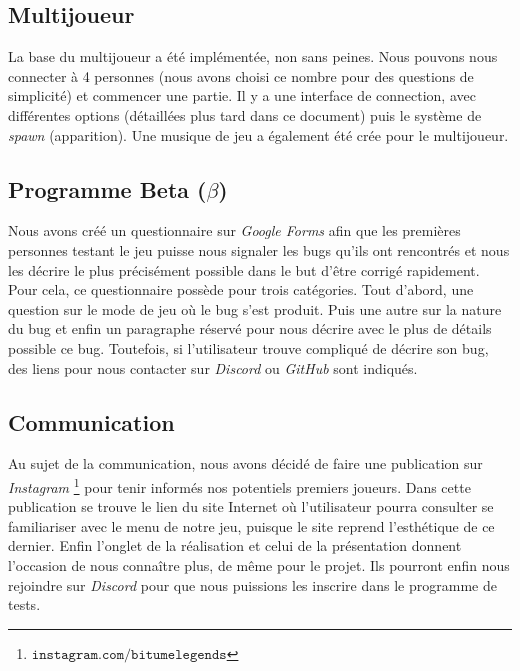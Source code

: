 \documentclass[12pt,a4paper]{article}
\begin{document}
    \subsection{Multijoueur}
        La base du multijoueur a été implémentée, non sans peines. 
        Nous pouvons nous connecter à 4 personnes (nous avons choisi ce nombre pour des questions 
        de simplicité) et commencer une partie. Il y a une interface de connection, avec différentes 
        options (détaillées plus tard dans ce document) puis le système de \textit{spawn} (apparition).
        Une musique de jeu a également été crée pour le multijoueur.
  
    \subsection{Programme Beta (\(\beta\))}
        Nous avons créé un questionnaire sur \textsl{Google Forms} afin que les premières personnes testant
        le jeu puisse nous signaler les bugs qu'ils ont rencontrés et nous les décrire le plus 
        précisément possible dans le but d'être corrigé rapidement. Pour cela, ce questionnaire 
        possède pour trois catégories. Tout d'abord, une question sur le mode de jeu où le bug 
        s'est produit. Puis une autre sur la nature du bug et enfin un paragraphe réservé
        pour nous décrire avec le plus de détails possible ce bug. Toutefois, si l'utilisateur
        trouve compliqué de décrire son bug, des liens pour nous contacter sur \textsl{Discord} 
        ou \textsl{GitHub} sont indiqués.
  
    \subsection{Communication}
        Au sujet de la communication, nous avons décidé de faire une publication sur \textsl{Instagram}
        \footnote{\(\mathtt{instagram.com/bitumelegends}\)}
        pour tenir informés nos potentiels premiers joueurs. Dans cette publication se trouve le lien 
        du site Internet où l'utilisateur pourra consulter se familiariser avec le menu de notre
        jeu, puisque le site reprend l'esthétique de ce dernier. Enfin l'onglet de la réalisation
        et celui de la présentation donnent l'occasion de nous connaître plus, de même pour le projet.
        Ils pourront enfin nous rejoindre sur \textsl{Discord} pour que nous puissions les inscrire dans le
        programme de tests.
  
\end{document}
